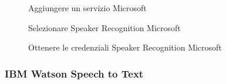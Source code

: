 \begin{figure}[H]
	\caption{Aggiungere un servizio Microsoft}\label{fig:addMicrosoft}
\end{figure}
\begin{figure}[H]
	\caption{Selezionare Speaker Recognition Microsoft}\label{fig:speakerRec}
\end{figure}
\begin{figure}[H]
	\caption{Ottenere le credenziali Speaker Recognition Microsoft}\label{fig:credMicrosoft}
\end{figure}
\newpage
\subsubsection{IBM Watson Speech to Text}\label{watson-key}
